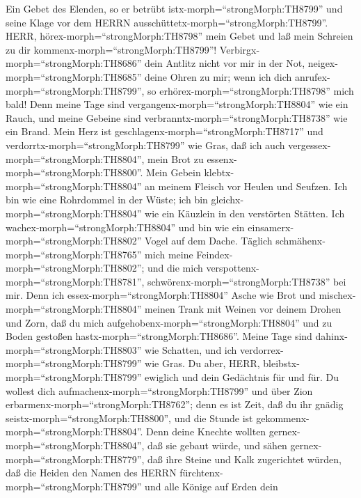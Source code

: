  Ein Gebet des Elenden, so er betrübt
istx-morph=``strongMorph:TH8799'' und seine Klage vor dem HERRN
ausschüttetx-morph=``strongMorph:TH8799''. HERR,
hörex-morph=``strongMorph:TH8798'' mein Gebet und laß mein Schreien zu
dir kommenx-morph=``strongMorph:TH8799''! 
Verbirgx-morph=``strongMorph:TH8686'' dein Antlitz nicht vor mir in der
Not, neigex-morph=``strongMorph:TH8685'' deine Ohren zu mir; wenn ich
dich anrufex-morph=``strongMorph:TH8799'', so
erhörex-morph=``strongMorph:TH8798'' mich bald!  Denn meine
Tage sind vergangenx-morph=``strongMorph:TH8804'' wie ein Rauch, und
meine Gebeine sind verbranntx-morph=``strongMorph:TH8738'' wie ein
Brand.  Mein Herz ist
geschlagenx-morph=``strongMorph:TH8717'' und
verdorrtx-morph=``strongMorph:TH8799'' wie Gras, daß ich auch
vergessex-morph=``strongMorph:TH8804'', mein Brot zu
essenx-morph=``strongMorph:TH8800''.  Mein Gebein
klebtx-morph=``strongMorph:TH8804'' an meinem Fleisch vor Heulen und
Seufzen.  Ich bin wie eine Rohrdommel in der Wüste; ich bin
gleichx-morph=``strongMorph:TH8804'' wie ein Käuzlein in den verstörten
Stätten.  Ich wachex-morph=``strongMorph:TH8804'' und bin
wie ein einsamerx-morph=``strongMorph:TH8802'' Vogel auf dem Dache.
 Täglich schmähenx-morph=``strongMorph:TH8765'' mich meine
Feindex-morph=``strongMorph:TH8802''; und die mich
verspottenx-morph=``strongMorph:TH8781'',
schwörenx-morph=``strongMorph:TH8738'' bei mir.  Denn ich
essex-morph=``strongMorph:TH8804'' Asche wie Brot und
mischex-morph=``strongMorph:TH8804'' meinen Trank mit Weinen
 vor deinem Drohen und Zorn, daß du mich
aufgehobenx-morph=``strongMorph:TH8804'' und zu Boden gestoßen
hastx-morph=``strongMorph:TH8686''.  Meine Tage sind
dahinx-morph=``strongMorph:TH8803'' wie Schatten, und ich
verdorrex-morph=``strongMorph:TH8799'' wie Gras.  Du aber,
HERR, bleibstx-morph=``strongMorph:TH8799'' ewiglich und dein Gedächtnis
für und für.  Du wollest dich
aufmachenx-morph=``strongMorph:TH8799'' und über Zion
erbarmenx-morph=``strongMorph:TH8762''; denn es ist Zeit, daß du ihr
gnädig seistx-morph=``strongMorph:TH8800'', und die Stunde ist
gekommenx-morph=``strongMorph:TH8804''.  Denn deine Knechte
wollten gernex-morph=``strongMorph:TH8804'', daß sie gebaut würde, und
sähen gernex-morph=``strongMorph:TH8779'', daß ihre Steine und Kalk
zugerichtet würden,  daß die Heiden den Namen des HERRN
fürchtenx-morph=``strongMorph:TH8799'' und alle Könige auf Erden dein
